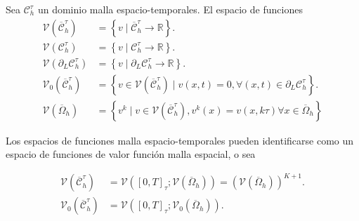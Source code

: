\begin{definition}
    Sea $\mathcal{C}^{\tau}_{h}$ un dominio malla espacio-temporales.
    El espacio de funciones
    \begin{align*}
        \mathcal{V}
        \left(
        \overline{\mathcal{C}}^{\tau}_{h}
        \right) & =
        \left\{
        v\mid\overline{\mathcal{C}}^{\tau}_{h}\to\mathbb{R}
        \right\}.   \\
        \mathcal{V}
        \left(
        \mathcal{C}^{\tau}_{h}
        \right) & =
        \left\{
        v\mid\mathcal{C}^{\tau}_{h}\to\mathbb{R}
        \right\}.   \\
        \mathcal{V}
        \left(
        \partial_{L}\mathcal{C}^{\tau}_{h}
        \right) & =
        \left\{
        v\mid\partial_{L}\mathcal{C}^{\tau}_{h}\to\mathbb{R}
        \right\}.   \\
        \mathcal{V}_{0}
        \left(
        \overline{\mathcal{C}}^{\tau}_{h}
        \right) & =
        \left\{
        v\in\mathcal{V}\left(\overline{\mathcal{C}}^{\tau}_{h}\right)\mid
        v\left(x,t\right)=0,
        \forall\left(x,t\right)\in\partial_{L}\mathcal{C}^{\tau}_{h}
        \right\}.   \\
        \mathcal{V}
        \left(
        \overline{\Omega}_{h}
        \right) & =
        \left\{
        v^{k}\mid
        v\in
        \mathcal{V}
        \left(
        \overline{\mathcal{C}}^{\tau}_{h}
        \right),
        v^{k}\left(x\right)=
        v\left(x,k\tau\right)
        \forall x\in\overline{\Omega}_{h}
        \right\}
    \end{align*}
\end{definition}

Los espacios de funciones malla espacio-temporales pueden
identificarse como un espacio de funciones de valor función malla
espacial, o sea

\begin{align*}
    \mathcal{V}
    \left(
    \overline{\mathcal{C}}^{\tau}_{h}
    \right) & =
    \mathcal{V}
    \left(
    \left[0,T\right]_{\tau};
    \mathcal{V}\left(\overline{\Omega}_{h}\right)
    \right)=
    {\left(\mathcal{V}\left(\overline{\Omega}_{h}\right)\right)}^{K+1}. \\
    \mathcal{V}_{0}
    \left(
    \overline{\mathcal{C}}^{\tau}_{h}
    \right) & =
    \mathcal{V}
    \left(
    \left[0,T\right]_{\tau};
    \mathcal{V}_{0}\left(\overline{\Omega}_{h}\right)
    \right).
\end{align*}


